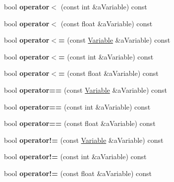 \begin{DoxyCompactItemize}
\item 
\hypertarget{a00027_a7128a2f9884ba7222e9f208cf72687bf}{bool {\bfseries operator$<$} (const int \&a\+Variable) const }\label{a00027_a7128a2f9884ba7222e9f208cf72687bf}

\item 
\hypertarget{a00027_a5ab2b61d4607368b6f14a50684d1ecfe}{bool {\bfseries operator$<$} (const float \&a\+Variable) const }\label{a00027_a5ab2b61d4607368b6f14a50684d1ecfe}

\item 
\hypertarget{a00027_aacb11a665a3e9552980747e6d842162d}{bool {\bfseries operator$<$=} (const \hyperlink{a00027}{Variable} \&a\+Variable) const }\label{a00027_aacb11a665a3e9552980747e6d842162d}

\item 
\hypertarget{a00027_a7ac8de58557d03d71305e126f8a956a5}{bool {\bfseries operator$<$=} (const int \&a\+Variable) const }\label{a00027_a7ac8de58557d03d71305e126f8a956a5}

\item 
\hypertarget{a00027_a5aa6c62d3f1fcd234b91583840de4be4}{bool {\bfseries operator$<$=} (const float \&a\+Variable) const }\label{a00027_a5aa6c62d3f1fcd234b91583840de4be4}

\item 
\hypertarget{a00027_adf8d943c0ffb988e6c3ca02f6655bd0c}{bool {\bfseries operator==} (const \hyperlink{a00027}{Variable} \&a\+Variable) const }\label{a00027_adf8d943c0ffb988e6c3ca02f6655bd0c}

\item 
\hypertarget{a00027_a38b9c17962d150167df81278f078cd8f}{bool {\bfseries operator==} (const int \&a\+Variable) const }\label{a00027_a38b9c17962d150167df81278f078cd8f}

\item 
\hypertarget{a00027_afa901b4271c8e247067b58e7f13db143}{bool {\bfseries operator==} (const float \&a\+Variable) const }\label{a00027_afa901b4271c8e247067b58e7f13db143}

\item 
\hypertarget{a00027_aade291dab2de60dbd5413599b1a816a4}{bool {\bfseries operator!=} (const \hyperlink{a00027}{Variable} \&a\+Variable) const }\label{a00027_aade291dab2de60dbd5413599b1a816a4}

\item 
\hypertarget{a00027_a849761ed0d493ff8c341d85ee77f3ad1}{bool {\bfseries operator!=} (const int \&a\+Variable) const }\label{a00027_a849761ed0d493ff8c341d85ee77f3ad1}

\item 
\hypertarget{a00027_aac4ceb266a19c0f3dd456f01ca6a9961}{bool {\bfseries operator!=} (const float \&a\+Variable) const }\label{a00027_aac4ceb266a19c0f3dd456f01ca6a9961}

\end{DoxyCompactItemize}
